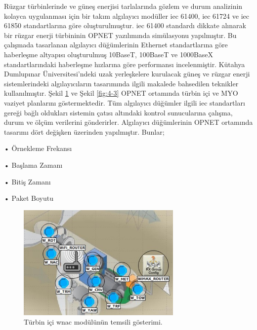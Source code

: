 Rüzgar türbinlerinde ve güneş enerjisi tarlalarında gözlem ve durum analizinin kolayca uygulanması için bir takım algılayıcı modüller \gls{iec} 61400, \gls{iec} 61724 ve \gls{iec} 61850 standartlarına göre oluşturulmuştur\cite{ahmed2011simulation}. \gls{iec} 61400 standardı dikkate alınarak bir rüzgar enerji türbininin OPNET yazılımında simülasyonu yapılmıştır. Bu çalışmada tasarlanan algılayıcı düğümlerinin Ethernet standartlarına göre haberleşme altyapısı oluşturulmuş 10BaseT, 100BaseT ve 1000BaseX standartlarındaki haberleşme hızlarına göre performansı incelenmiştir.
Kütahya Dumlupınar Üniversitesi'ndeki uzak yerleşkelere kurulacak güneş ve rüzgar enerji sistemlerindeki algılayıcıların tasarımında ilgili makalede bahsedilen teknikler kullanılmıştır. Şekil \ref{fig:4-2} ve Şekil \ref{fig:4-3} OPNET ortamında türbin içi ve MYO vaziyet planlarını göstermektedir. Tüm algılayıcı düğümler ilgili \gls{iec} standartları gereği bağlı oldukları sistemin çatısı altındaki kontrol sunucularına çalışma, durum ve ölçüm verilerini gönderirler. Algılayıcı düğümlerinin OPNET ortamında tasarımı dört değişken üzerinden yapılmıştır\cite{ahmed2011simulation}. Bunlar;

•	Örnekleme Frekansı

•	Başlama Zamanı

•	Bitiş Zamanı

•	Paket Boyutu

\begin{figure}[htbp]
\centerline{\includegraphics[width=8cm]{Resim/Wind_inside.jpg}}
\caption{Türbin içi \gls{wnac} modülünün temsili gösterimi.}
\label{fig:4-2}
\end{figure}


